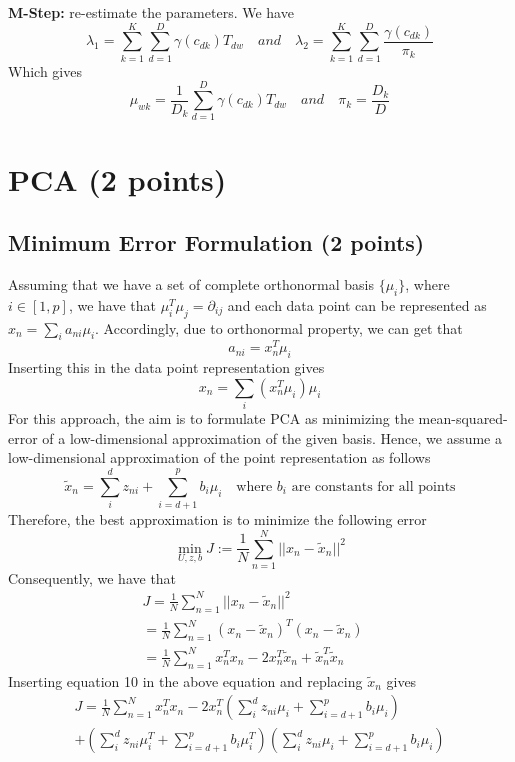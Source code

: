 \documentclass[12pt,a4paper]{article}
\begin{document}
	\noindent \textbf{M-Step:} re-estimate the parameters. We have
	\begin{equation}
		\lambda_1 = \sum_{k=1}^{K}\sum_{d=1}^{D}\gamma (c_{dk})T_{dw} \quad and \quad \lambda_2 = \sum_{k=1}^{K}\sum_{d=1}^{D}\frac{\gamma (c_{dk})}{\pi_k}
	\end{equation}
	Which gives
	\begin{equation}
		\mu_{wk} = \frac{1}{D_k}\sum_{d=1}^{D} \gamma (c_{dk})T_{dw} \quad and \quad \pi_k = \frac{D_k}{D} 
	\end{equation}
		
	\section{PCA (2 points)}
	\subsection{Minimum Error Formulation (2 points)}
	
	\noindent Assuming that we have a set of complete orthonormal basis $\{\mu_i\}$, where $i\in[1,p]$, we have that $\mu_i^T\mu_j=\partial_{ij}$ and each data point can be represented as $x_n=\sum_{i}a_{ni}\mu_i$. Accordingly, due to orthonormal property, we can get that
	\begin{equation}
		a_{ni}=x_n^T\mu_i
	\end{equation}
	Inserting this in the data point representation gives
	\begin{equation}
		x_n=\sum_{i}(x_n^T\mu_i)\mu_i
	\end{equation}
	For this approach, the aim is to formulate PCA as minimizing
	the mean-squared-error of a low-dimensional approximation of the given basis. Hence, we assume a low-dimensional approximation of the point representation as follows
	\begin{equation}
		\widetilde{x}_n=\sum_{i}^{d}z_{ni}+\sum_{i=d+1}^{p}b_i\mu_i \quad \text{where $b_i$ are constants for all points}
	\end{equation}
	Therefore, the best approximation is to minimize the following error
	\begin{equation}
		\underset{ U,z,b}{\min}  J:=\frac{1}{N}\sum_{n=1}^{N}||x_n-\widetilde{x}_n||^2
	\end{equation}
	Consequently, we have that
	\begin{align*}
		J = \frac{1}{N}\sum_{n=1}^{N}||x_n-\widetilde{x}_n||^2\qquad \qquad \quad\\= \frac{1}{N}\sum_{n=1}^{N} (x_n-\widetilde{x}_n)^T(x_n-\widetilde{x}_n) \quad \\
		= \frac{1}{N}\sum_{n=1}^{N} x_n^Tx_n-2x_n^T \widetilde{x}_n + \widetilde{x}_n^T\widetilde{x}_n
	\end{align*}
	\noindent Inserting equation 10 in the above equation and replacing $\widetilde{x}_n$ gives
	\begin{align*}
		J = \frac{1}{N}\sum_{n=1}^{N} x_n^Tx_n-2x_n^T (\sum_{i}^{d}z_{ni}\mu_i+\sum_{i=d+1}^{p}b_i\mu_i) \\+ (\sum_{i}^{d}z_{ni}\mu_i^T+ 
		\sum_{i=d+1}^{p}b_i\mu_i^T)(\sum_{i}^{d}z_{ni}\mu_i+\sum_{i=d+1}^{p}b_i\mu_i)
	\end{align*}
	
\end{document}
